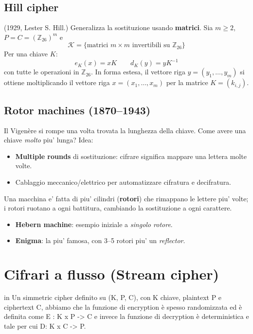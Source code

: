 \subsection{Hill cipher}
(1929, Lester S. Hill.) Generalizza la sostituzione usando \textbf{matrici}. Sia $m \ge 2$, $P = C = (\mathbb{Z}_{26})^m$ e
\[
  \mathcal{K} = \{\text{matrici } m \times m \text{ invertibili su } \mathbb{Z}_{26}\}
\]
Per una chiave $K$:
\[
  e_K(x) = x K \qquad d_K(y) = y K^{-1}
\]
con tutte le operazioni in $\mathbb{Z}_{26}$. In forma estesa, il vettore riga $y = (y_1, \dots, y_m)$ si ottiene moltiplicando il vettore riga $x = (x_1, \dots, x_m)$ per la matrice $K = (k_{i,j})$.


\subsection{Rotor machines (1870--1943)}
Il Vigen\`ere si rompe una volta trovata la lunghezza della chiave. Come avere una chiave \textit{molto} piu' lunga? Idea:
\begin{itemize}
  \item \textbf{Multiple rounds} di sostituzione: cifrare significa mappare una lettera molte volte.
  \item Cablaggio meccanico/elettrico per automatizzare cifratura e decifratura.
\end{itemize}
Una macchina e' fatta di piu' cilindri (\textbf{rotori}) che rimappano le lettere piu' volte; i rotori ruotano a ogni battitura, cambiando la sostituzione a ogni carattere.
\begin{itemize}
  \item \textbf{Hebern machine}: esempio iniziale a \textit{singolo rotore}.
  \item \textbf{Enigma}: la piu' famosa, con 3--5 rotori piu' un \textit{reflector}.
\end{itemize}

\section{Cifrari a flusso (Stream cipher)}
in Un simmetric cipher definito su (K, P, C), con K chiave, plaintext P e ciphertext C, abbiamo che la funzione di encryption è spesso randomizzata ed è definita come E : K x P -> C e invece la 
funzione di decryption è deterministica e tale per cui D: K x C -> P.

